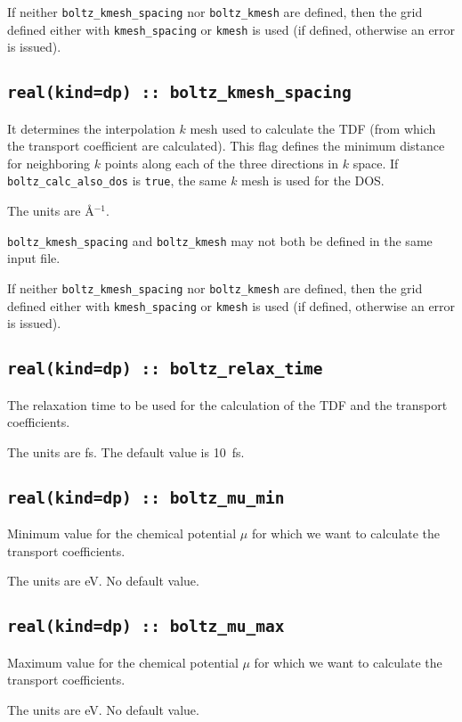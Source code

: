 If neither {\tt boltz\_kmesh\_spacing} nor  {\tt boltz\_kmesh} are defined, then the grid defined either with {\tt kmesh\_spacing} or {\tt kmesh} is used (if defined, otherwise an error is issued).

\subsection[boltz\_kmesh\_spacing]{\tt real(kind=dp) :: boltz\_kmesh\_spacing}
It determines the interpolation $k$ mesh used to calculate the TDF (from which the transport coefficient are calculated). This flag defines the minimum distance for neighboring $k$ points along each of the three directions in $k$ space. If {\tt boltz\_calc\_also\_dos} is \verb#true#, the same $k$ mesh is used for the DOS.

The units are \AA$^{-1}$.

{\tt boltz\_kmesh\_spacing} and  {\tt boltz\_kmesh} may not both be defined in the same input file.

If neither {\tt boltz\_kmesh\_spacing} nor  {\tt boltz\_kmesh} are defined, then the grid defined either with {\tt kmesh\_spacing} or {\tt kmesh} is used (if defined, otherwise an error is issued).

\subsection[boltz\_relax\_time]{\tt real(kind=dp) :: boltz\_relax\_time}
The relaxation time to be used for the calculation of the TDF and the transport coefficients.

The units are fs.
The default value is 10~fs.

\subsection[boltz\_mu\_min]{\tt real(kind=dp) :: boltz\_mu\_min}
Minimum value for the chemical potential $\mu$ for which we want to calculate the transport coefficients.

The units are eV.
No default value.

\subsection[boltz\_mu\_max]{\tt real(kind=dp) :: boltz\_mu\_max}
Maximum value for the chemical potential $\mu$ for which we want to calculate the transport coefficients.

The units are eV.
No default value.

